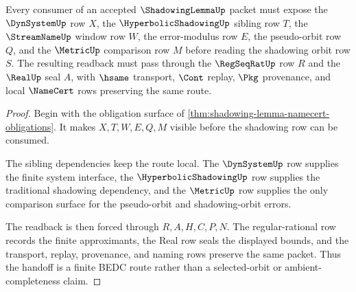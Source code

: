 \begin{theorem}
\label{thm:shadowing-lemma-pseudo-orbit-handoff}
Every consumer of an accepted $\ShadowingLemmaUp$ packet must expose the $\DynSystemUp$ row $X$, the $\HyperbolicShadowingUp$ sibling row $T$, the $\StreamNameUp$ window row $W$, the error-modulus row $E$, the pseudo-orbit row $Q$, and the $\MetricUp$ comparison row $M$ before reading the shadowing orbit row $S$. The resulting readback must pass through the $\RegSeqRatUp$ row $R$ and the $\RealUp$ seal $A$, with $\hsame$ transport, $\Cont$ replay, $\Pkg$ provenance, and local $\NameCert$ rows preserving the same route.
\end{theorem}
\begin{proof}
Begin with the obligation surface of \autoref{thm:shadowing-lemma-namecert-obligations}. It makes $X,T,W,E,Q,M$ visible before the shadowing row can be consumed.

The sibling dependencies keep the route local. The $\DynSystemUp$ row supplies the finite system interface, the $\HyperbolicShadowingUp$ row supplies the traditional shadowing dependency, and the $\MetricUp$ row supplies the only comparison surface for the pseudo-orbit and shadowing-orbit errors.

The readback is then forced through $R,A,H,C,P,N$. The regular-rational row records the finite approximants, the Real row seals the displayed bounds, and the transport, replay, provenance, and naming rows preserve the same packet. Thus the handoff is a finite BEDC route rather than a selected-orbit or ambient-completeness claim.
\end{proof}


\begin{closurestatus}{\ShadowingLemmaUp}
  \theoryclosure{\seedClosure}
  \formalstatus{\unformalizedV}
\end{closurestatus}
